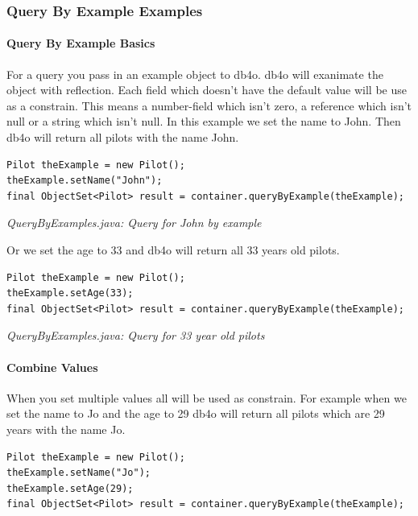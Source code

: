 \subsubsection{Query By Example Examples}
\label{ref:basics-querying-query-by-example-qby-examples}

\paragraph{Query By Example Basics}
\label{ref:basics-querying-query-by-example-qby-examples:basics}

For a query you pass in an example object to db4o. db4o will exanimate the object with reflection. Each field which doesn't have the default value will be use as a constrain. This means a number-field which isn't zero, a reference which isn't null or a string which isn't null. In this example we set the name to John. Then db4o will return all pilots with the name John.

\begin{lstlisting}
Pilot theExample = new Pilot();
theExample.setName("John");
final ObjectSet<Pilot> result = container.queryByExample(theExample);
\end{lstlisting}

{\small\itshape QueryByExamples.java: Query for John by example\par}
\medskip

Or we set the age to 33 and db4o will return all 33 years old pilots.

\begin{lstlisting}
Pilot theExample = new Pilot();
theExample.setAge(33);
final ObjectSet<Pilot> result = container.queryByExample(theExample);
\end{lstlisting}

{\small\itshape QueryByExamples.java: Query for 33 year old pilots\par}
\medskip

\paragraph{Combine Values}
\label{ref:basics-querying-query-by-example-qby-examples:combine}

When you set multiple values all will be used as constrain. For example when we set the name to Jo and the age to 29 db4o will return all pilots which are 29 years with the name Jo.

\begin{lstlisting}
Pilot theExample = new Pilot();
theExample.setName("Jo");
theExample.setAge(29);
final ObjectSet<Pilot> result = container.queryByExample(theExample);
\end{lstlisting}

